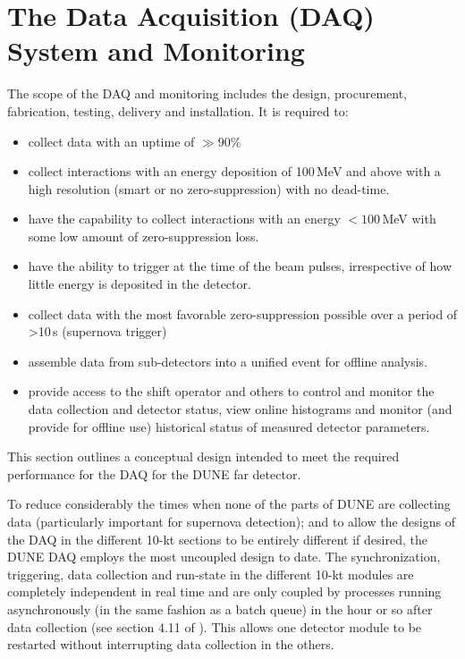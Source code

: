\section{The Data Acquisition (DAQ) System and Monitoring} 
\label{sec:detectors-fd-ref-daq}

The scope of the DAQ and monitoring includes the design, procurement,
fabrication, testing, delivery and installation. It is required to:
\begin{itemize}
\item collect data with an uptime of $\gg 90$\%
\item collect interactions with an energy deposition of
  100\,MeV and above with a high resolution (smart or no
  zero-suppression) with no dead-time.
\item have the capability to collect interactions with an energy $<100$\,MeV with some
 low amount of zero-suppression loss.
\item have the ability to trigger at the time of the beam pulses,
  irrespective of how little energy is deposited in the detector.
\item collect data with the most favorable zero-suppression possible over a
  period of >10\,s (supernova trigger)
\item assemble data from sub-detectors into a unified
  event for offline analysis.
\item provide access to the shift operator and others to control and
  monitor the data collection and detector status, view online
  histograms and monitor (and provide for offline use) historical
  status of measured detector parameters. 
\end{itemize}
This section outlines a conceptual design intended to meet the required performance for the DAQ
for the DUNE far detector. 

To reduce considerably the times when none of the parts of DUNE are
collecting data (particularly important for supernova detection); and
to allow the designs of the DAQ in the different 10-kt sections to be
entirely different if desired, the DUNE DAQ employs the most uncoupled 
design to date. 
The synchronization, triggering, data collection and run-state in the
different 10-kt modules are completely independent in real time and
are only coupled by processes running asynchronously (in the same fashion
as a batch queue) in the hour or so after data collection (see section
4.11 of \anxlbnefd).  This allows one %
detector module to be restarted without interrupting data collection in the
others. %

